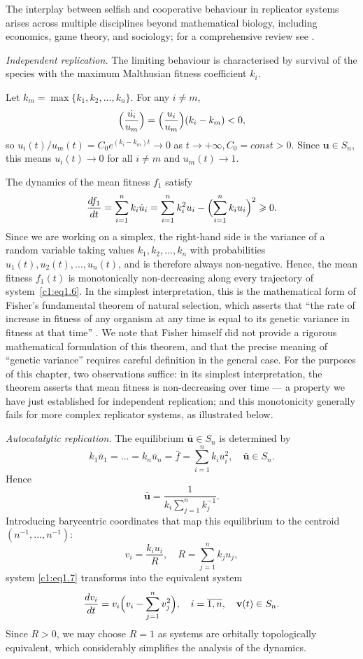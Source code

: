 \documentclass[12pt]{report}
\theoremstyle{definition}
\theoremstyle{remark}
\begin{document}
The interplay between selfish and cooperative behaviour in replicator systems arises across multiple disciplines beyond mathematical biology, including economics, game theory, and sociology; for a comprehensive review see \cite{c1:Sigmund2009}.

\medskip
\textit{Independent replication.}
The limiting behaviour is characterised by survival of the species
with the maximum Malthusian fitness coefficient $k_{i}$.

Let $k_{m}=\max\{k_{1},k_{2},\ldots,k_{n}\}$.
For any $i\neq m$,
\[
  \dot{\Bigl(\frac{u_{i}}{u_{m}}\Bigr)}
  =\Bigl(\frac{u_{i}}{u_{m}}\Bigr)(k_{i}-k_{m})<0,
\]
so $u_{i}(t)/u_{m}(t)=C_{0}e^{(k_{i}-k_{m})t}\to 0$
as $t\to+\infty, C_0 = const>0$.  Since $\mathbf{u}\in S_{n}$, this means $u_{i}(t)\to 0$ for all $i\neq m$ and $u_{m}(t)\to 1$.

The dynamics of the mean fitness $f_1$ satisfy
\[
  \frac{df_{1}}{dt}
  =\sum_{i=1}^{n}k_{i}\dot u_{i} = \sum_{i=1}^{n}k_{i}^{2}u_{i}
   -\Bigl(\sum_{i=1}^{n}k_{i}u_{i}\Bigr)^{2}\geqslant 0.
\]
Since we are working on a simplex, the right-hand side is the variance of a random variable taking values $k_1,k_2,\ldots,k_n$ with probabilities $u_1(t),u_2(t),\ldots,u_n(t)$, and is therefore 
always non-negative. Hence, the mean fitness $f_1(t)$ is monotonically non-decreasing along every trajectory of system~\eqref{c1:eq1.6}. In the simplest interpretation, this is the mathematical form of Fisher's fundamental theorem of natural selection, which asserts that ``the rate of increase in fitness of any organism at any time is equal to its genetic variance in fitness at that time'' \cite{c1:Fisher1930}.
We note that Fisher himself did not provide a rigorous mathematical formulation of this theorem, and that the precise meaning of ``genetic variance'' requires careful definition in the general case. For the purposes of this chapter, two observations suffice: in its simplest interpretation, the theorem asserts that mean fitness is non-decreasing over time — a property we have just established for independent replication; and this monotonicity generally fails for more complex replicator systems, as illustrated below.


\medskip
\textit{Autocatalytic replication.}
The equilibrium $\bar{\mathbf{u}}\in S_{n}$ is determined by
\[
  k_{1}\bar{u}_{1}=\ldots=k_{n}\bar{u}_{n}
  =\bar{f}=\sum_{i=1}^{n}k_{i}u_{i}^{2},\quad \bar{\mathbf{u}}\in S_{n}.
\]
Hence
\[
  \bar{\mathbf{u}}
  =\frac{1}{k_{i}\sum_{j=1}^{n}k_{j}^{-1}}.
\]
Introducing barycentric coordinates \cite{c1:Hofbauer1978} 
that map this equilibrium to the centroid $(n^{-1},\ldots,n^{-1})$:
\[
  v_{i}=\frac{k_{i}u_{i}}{R},\quad R=\sum_{j=1}^{n}k_{j}u_{j},
\]
system \eqref{c1:eq1.7} transforms into the equivalent system
\begin{equation}
  \frac{dv_{i}}{dt}=v_{i}\Bigl(v_{i}-\sum_{j=1}^{n}v_{j}^{2}\Bigr),
  \quad i=\overline{1,n},\quad \mathbf{v}(t)\in S_{n}.
  \label{c1:eq1.9}
\end{equation}
Since $R > 0$, we may choose $R=1$ as systems are orbitally topologically equivalent, which 
considerably simplifies the analysis of the dynamics.
\end{document}
